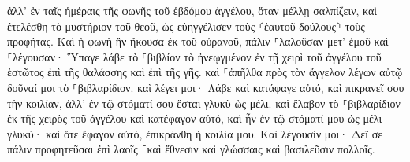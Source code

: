 \documentclass{openreader}
\begin{document}
ἀλλ’ ἐν ταῖς ἡμέραις τῆς φωνῆς τοῦ ἑβδόμου ἀγγέλου, ὅταν μέλλῃ σαλπίζειν, καὶ ἐτελέσθη τὸ μυστήριον τοῦ θεοῦ, ὡς εὐηγγέλισεν τοὺς ⸂ἑαυτοῦ δούλους⸃ τοὺς προφήτας. 
Καὶ ἡ φωνὴ ἣν ἤκουσα ἐκ τοῦ οὐρανοῦ, πάλιν ⸀λαλοῦσαν μετ’ ἐμοῦ καὶ ⸀λέγουσαν· Ὕπαγε λάβε τὸ ⸀βιβλίον τὸ ἠνεῳγμένον ἐν τῇ χειρὶ τοῦ ἀγγέλου τοῦ ἑστῶτος ἐπὶ τῆς θαλάσσης καὶ ἐπὶ τῆς γῆς. 
καὶ ⸀ἀπῆλθα πρὸς τὸν ἄγγελον λέγων αὐτῷ δοῦναί μοι τὸ ⸀βιβλαρίδιον. καὶ λέγει μοι· Λάβε καὶ κατάφαγε αὐτό, καὶ πικρανεῖ σου τὴν κοιλίαν, ἀλλ’ ἐν τῷ στόματί σου ἔσται γλυκὺ ὡς μέλι. 
καὶ ἔλαβον τὸ ⸀βιβλαρίδιον ἐκ τῆς χειρὸς τοῦ ἀγγέλου καὶ κατέφαγον αὐτό, καὶ ἦν ἐν τῷ στόματί μου ὡς μέλι γλυκύ· καὶ ὅτε ἔφαγον αὐτό, ἐπικράνθη ἡ κοιλία μου. 
Καὶ λέγουσίν μοι· Δεῖ σε πάλιν προφητεῦσαι ἐπὶ λαοῖς ⸀καὶ ἔθνεσιν καὶ γλώσσαις καὶ βασιλεῦσιν πολλοῖς. 
\end{document}
